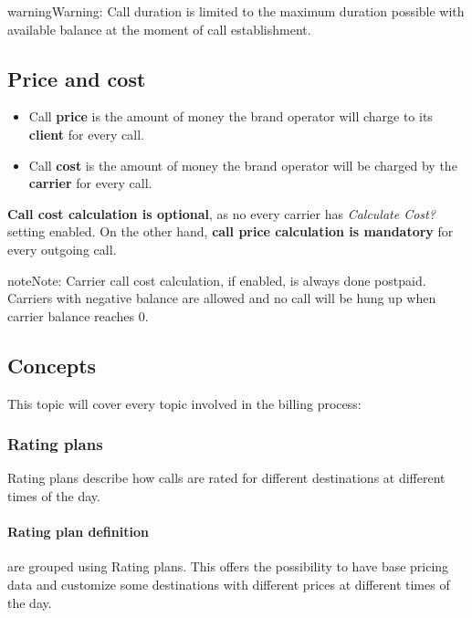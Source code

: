 \documentclass[letterpaper,10pt,english]{sphinxmanual}
\begin{document}
\begin{notice}{warning}{Warning:}
Call duration is limited to the maximum duration possible with available balance at the moment of call establishment.
\end{notice}


\subsection{Price and cost}
\label{administration_portal/brand/billing/index:price-and-cost}\begin{itemize}
\item {} 
Call \textbf{price} is the amount of money the brand operator will charge to its \textbf{client} for every call.

\item {} 
Call \textbf{cost} is the amount of money the brand operator will be charged by the \textbf{carrier} for every call.

\end{itemize}

\textbf{Call cost calculation is optional}, as no every carrier has \emph{Calculate Cost?} setting enabled. On the other hand, \textbf{call
price calculation is mandatory} for every outgoing call.

\begin{notice}{note}{Note:}
Carrier call cost calculation, if enabled, is always done postpaid. Carriers with negative balance are allowed and
no call will be hung up when carrier balance reaches 0.
\end{notice}


\subsection{Concepts}
\label{administration_portal/brand/billing/index:concepts}
This topic will cover every topic involved in the billing process:


\subsubsection{Rating plans}
\label{administration_portal/brand/billing/rating_plans:rating-plans}\label{administration_portal/brand/billing/rating_plans::doc}
Rating plans describe how calls are rated for different destinations at different times of the day.


\paragraph{Rating plan definition}
\label{administration_portal/brand/billing/rating_plans:rating-plan-definition}
{\hyperref[administration_portal/brand/billing/destination_rates:destination\string-rates]{}} are grouped using Rating plans. This offers the possibility to have base pricing data and customize
some destinations with different prices at different times of the day.
\end{document}
